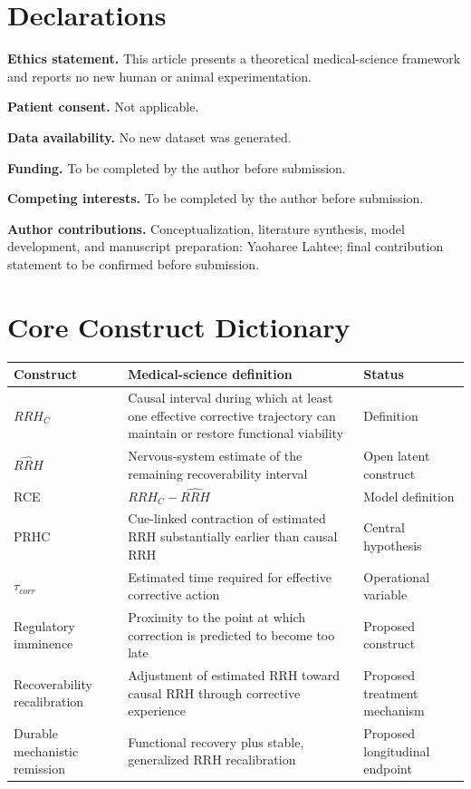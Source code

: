 \documentclass[11pt]{article}
\begin{document}
\section*{Declarations}

\textbf{Ethics statement.} This article presents a theoretical medical-science framework and reports no new human or animal experimentation.

\textbf{Patient consent.} Not applicable.

\textbf{Data availability.} No new dataset was generated.

\textbf{Funding.} To be completed by the author before submission.

\textbf{Competing interests.} To be completed by the author before submission.

\textbf{Author contributions.} Conceptualization, literature synthesis, model development, and manuscript preparation: Yaoharee Lahtee; final contribution statement to be confirmed before submission.

\appendix
\section{Core Construct Dictionary}

\begin{longtable}{p{}p{}p{}}
\toprule
\textbf{Construct} & \textbf{Medical-science definition} & \textbf{Status} \\
\midrule
$RRH_C$ & Causal interval during which at least one effective corrective trajectory can maintain or restore functional viability & Definition \\
$\widehat{RRH}$ & Nervous-system estimate of the remaining recoverability interval & Open latent construct \\
RCE & $RRH_C-\widehat{RRH}$ & Model definition \\
PRHC & Cue-linked contraction of estimated RRH substantially earlier than causal RRH & Central hypothesis \\
$\tau_{corr}$ & Estimated time required for effective corrective action & Operational variable \\
Regulatory imminence & Proximity to the point at which correction is predicted to become too late & Proposed construct \\
Recoverability recalibration & Adjustment of estimated RRH toward causal RRH through corrective experience & Proposed treatment mechanism \\
Durable mechanistic remission & Functional recovery plus stable, generalized RRH recalibration & Proposed longitudinal endpoint \\
\bottomrule
\end{longtable}
\end{document}
